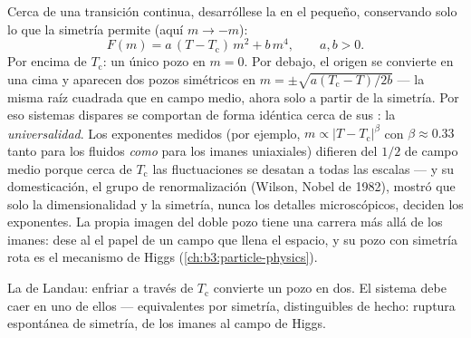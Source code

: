 \begin{proposition}\label{prop:b3:phase-transitions:landau}
Cerca de una transición continua, desarróllese la  en el
 pequeño, conservando solo lo que la simetría permite (aquí
$m \to -m$):
\[
F(m) = a\,(T - T_{\text{c}})\,m^2 + b\,m^4 , \qquad a, b > 0 .
\]
Por encima de $T_{\text{c}}$: un único pozo en $m = 0$. Por debajo, el origen
se convierte en una cima y aparecen dos pozos simétricos en $m = \pm
\sqrt{a(T_{\text{c}} - T)/2b}$ --- la misma raíz cuadrada que en campo
medio, ahora solo a partir de la simetría. Por eso sistemas dispares
se comportan de forma idéntica cerca de sus :
la \emph{universalidad}. Los exponentes medidos (por ejemplo, $m \propto |T -
T_{\text{c}}|^\beta$ con $\beta \approx 0.33$ tanto para los fluidos
\emph{como} para los imanes uniaxiales) difieren del $1/2$ de campo medio
porque cerca de $T_{\text{c}}$ las fluctuaciones se desatan a todas las escalas ---
y su domesticación, el grupo de renormalización (Wilson, Nobel de 1982),
mostró que solo la dimensionalidad y la simetría, nunca los detalles
microscópicos, deciden los exponentes. La propia imagen del doble pozo tiene
una carrera más allá de los imanes: dese al  el papel de un
campo que llena el espacio, y su pozo con simetría rota es el mecanismo
de Higgs (\cref{ch:b3:particle-physics}).
\end{proposition}
\admitted

\begin{omfigure}

{\small La  de Landau: enfriar a través de $T_{\text{c}}$ convierte
un pozo en dos. El sistema debe caer en uno de ellos ---
equivalentes por simetría, distinguibles de hecho: ruptura espontánea
de simetría, de los imanes al campo de Higgs.}
\end{omfigure}

